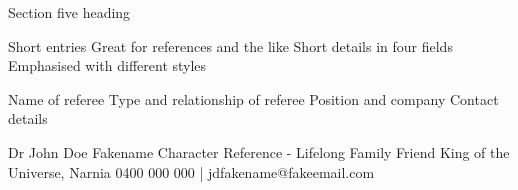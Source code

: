 \begin{tmrsection}{Section five heading}

\tmrshortentry
 	 {Short entries}
 	 {Great for references and the like}
 	 {Short details in four fields}
 	 {Emphasised with different styles}
  	
\tmrshortentry
 	 {Name of referee}
 	 {Type and relationship of referee}
 	 {Position and company}
 	 {Contact details}
    
\tmrshortentry
 	 {Dr John Doe Fakename}
 	 {Character Reference - Lifelong Family Friend}
 	 {King of the Universe, Narnia}
 	 {0400 000 000 | jdfakename@fakeemail.com}
	
\end{tmrsection}